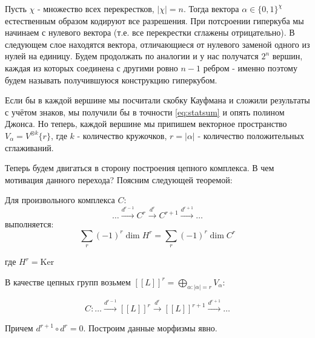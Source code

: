 \documentclass[a4paper,8pt]{extarticle}
\begin{document}
\begin{multicols}{2}
    Пусть $\chi$ - множество всех перекрестков, $|\chi| = n$. Тогда вектора $\alpha \in
    \{0,1\}^\chi$ естественным образом кодируют все разрешения. При
    потсроении гиперкуба мы начинаем с нулевого вектора (т.е. все
    перекрестки сглажены отрицательно). В следующем слое находятся
    вектора, отличающиеся от нулевого заменой одного из нулей на
    единицу. Будем продолжать по аналогии и у нас получатся $2^n$
    вершин, каждая из которых соединена с другими ровно $n-1$ ребром - 
    именно поэтому будем называть получившуюся конструкцию гиперкубом.

    Если бы в каждой вершине мы посчитали скобку Кауфмана
    и сложили результаты с учётом знаков, мы получили бы в точности
    \eqref{eq:statsum} и опять полином Джонса. Но теперь, каждой
    вершине мы припишем векторное пространство $V_\alpha = V^{\otimes k}\{r\}$,
    где $k$ - количество кружочков, $r=|\alpha|$ - количество положительных
    сглаживаний.

    Теперь будем двигаться в сторону построения цепного комплекса.
    В чем мотивация данного перехода? Поясним следующей теоремой:

    \begin{tcolorbox}
        \begin{theorem}
        Для произвольного комплекса $C$:
        \begin{equation}
            \ldots \xrightarrow{d^{r-1}} C^r \xrightarrow{d^{r}}
            C^{r+1} \xrightarrow{d^{r+1}} \ldots
        \end{equation} 
        выполняется:
        \begin{equation}
            \sum_r (-1)^r \dim H^r = \sum_r (-1)^r \dim C^r
        \end{equation}

        где $H^r = \text{Ker}$
    \end{theorem}
    \end{tcolorbox}
    

    В качестве цепных групп возьмем $[\![ L ]\!]^r = \bigoplus_{\alpha: |\alpha|=r} V_\alpha$:

    \begin{equation}
        C: \ldots \xrightarrow{d^{r-1}} [\![ L ]\!]^r \xrightarrow{d^{r}} 
        [\![ L ]\!]^{r+1} \xrightarrow{d^{r+1}} \ldots
        \label{eq:complex-gen}
    \end{equation}

    Причем $d^{r+1} \circ d^{r} = 0$. Построим данные морфизмы явно.
    

\end{multicols}
\end{document}
